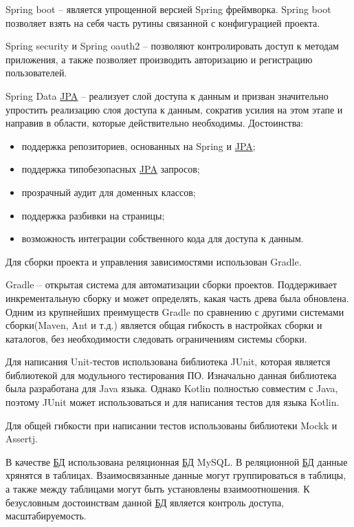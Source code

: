 Spring boot – является упрощенной версией Spring фреймворка.
Spring boot позволяет взять на себя часть рутины связанной с конфигурацией проекта.

Spring security и Spring oauth2 – позволяют контролировать доступ к методам приложения, а также позволяет производить авторизацию и регистрацию пользователей.

Spring Data \hyperlink{gloss:jpa}{JPA} – реализует слой доступа к данным и призван значительно упростить реализацию слоя доступа к данным, сократив усилия на этом этапе и направив в области, которые действительно необходимы.
Достоинства:
\begin{itemize}
    \item поддержка репозиториев, основанных на Spring и \hyperlink{gloss:jpa}{JPA};
    \item поддержка типобезопасных \hyperlink{gloss:jpa}{JPA} запросов;
    \item прозрачный аудит для доменных классов;
    \item поддержка разбивки на страницы;
    \item возможность интеграции собственного кода для доступа к данным.
\end{itemize}

Для сборки проекта и управления зависимостями использован Gradle.

Gradle – открытая система для автоматизации сборки проектов.
Поддерживает инкрементальную сборку и может определять, какая часть древа была обновлена.
Одним из крупнейших преимуществ Gradle по сравнению с другими системами сборки(Maven, Ant и т.д.) является общая гибкость в настройках сборки и каталогов, 
без необходимости следовать ограничениям системы сборки.

Для написания Unit-тестов использована библиотека JUnit, которая является библиотекой для модульного тестирования \hypertarget{gloss:software}{ПО}.
Изначально данная библиотека была разработана для Java языка. Однако Kotlin полностью совместим с Java, поэтому JUnit может использоваться и для написания тестов для языка Kotlin.

Для общей гибкости при написании тестов использованы библиотеки Mockk и Assertj.

В качестве \hyperlink{gloss:db}{БД} использована реляционная \hyperlink{gloss:db}{БД} MySQL. В реляционной \hyperlink{gloss:db}{БД} данные хрянятся в таблицах.
Взаимосвязанные данные могут группироваться в таблицы, а также между таблицами могут быть установлены взаимоотношения.
К безусловным достоинствам данной \hyperlink{gloss:db}{БД} является контроль доступа, масштабируемость.

